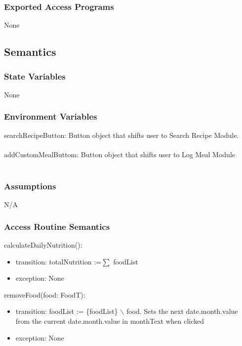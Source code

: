 \documentclass[12pt, titlepage]{article}
\begin{document}
\subsubsection{Exported Access Programs}

None

\subsection{Semantics}

\subsubsection{State Variables}
None

\subsubsection{Environment Variables}

searchRecipeButton: Button object that shifts user to Search Recipe Module.\\\\
addCustomMealButtom: Button object that shifts user to Log Meal Module\\\\

\subsubsection{Assumptions}

N/A

\subsubsection{Access Routine Semantics}

\noindent calculateDailyNutrition():
\begin{itemize}
\item transition: totalNutrition :=$ \sum $ foodList
\item exception: None 
\end{itemize}

\noindent removeFood(food: FoodT):
\begin{itemize}
\item transition: foodList := \{foodList\} $\backslash$ food. Sets the next date.month.value from the current date.month.value in monthText when clicked
\item exception: None 
\end{itemize}
\end{document}
